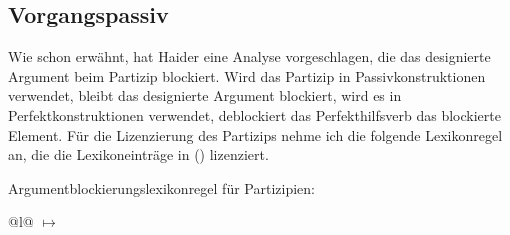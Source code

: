 \subsection{Vorgangspassiv}
\label{sec-agentive-passive-da}

Wie schon erwähnt, hat Haider eine Analyse vorgeschlagen, die das designierte Argument
beim Partizip blockiert. Wird das Partizip in Passivkonstruktionen verwendet, bleibt
das designierte Argument blockiert, wird es in Perfektkonstruktionen verwendet,
deblockiert das Perfekthilfsverb das blockierte Element. Für die Lizenzierung
des Partizips nehme ich die folgende Lexikonregel an, die die Lexikoneinträge in () 
lizenziert.


\eas
Argumentblockierungslexikonregel für Partizipien:\\
\label{lr-da-reduction}%
\begin{tabular}[t]{@{}l@{}}
 $\mapsto$\\
\end{tabular}
\zs

